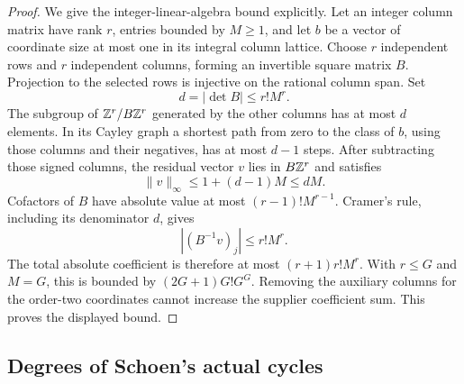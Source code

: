 \begin{proof}
We give the integer-linear-algebra bound explicitly. Let an integer column matrix have rank $r$, entries bounded by $M\ge1$, and let $b$ be a vector of coordinate size at most one in its integral column lattice. Choose $r$ independent rows and $r$ independent columns, forming an invertible square matrix $B$. Projection to the selected rows is injective on the rational column span. Set
\[
 d=|\det B|\le r!M^r.
\]
The subgroup of $\mathbb Z^r/B\mathbb Z^r$ generated by the other columns has at most $d$ elements. In its Cayley graph a shortest path from zero to the class of $b$, using those columns and their negatives, has at most $d-1$ steps. After subtracting those signed columns, the residual vector $v$ lies in $B\mathbb Z^r$ and satisfies
\[
 \|v\|_\infty\le1+(d-1)M\le dM.
\]
Cofactors of $B$ have absolute value at most $(r-1)!M^{r-1}$. Cramer's rule, including its denominator $d$, gives
\[
 |(B^{-1}v)_j|\le r!M^r.
\]
The total absolute coefficient is therefore at most $(r+1)r!M^r$. With $r\le G$ and $M=G$, this is bounded by $(2G+1)G!G^G$. Removing the auxiliary columns for the order-two coordinates cannot increase the supplier coefficient sum. This proves the displayed bound.
\end{proof}

\subsection{Degrees of Schoen's actual cycles}

